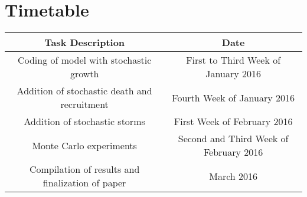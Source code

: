 \documentclass[12pt,letterpaper]{article}
\begin{document}


\section{Timetable}

\begin{tabular}{|c|c|}
\hline
Task Description & Date \\
\hline
Coding of model with stochastic growth & First to Third Week of January 2016\\
\hline
Addition of stochastic death and recruitment & Fourth Week of January 2016\\
\hline
Addition of stochastic storms & First Week of February 2016\\
\hline
Monte Carlo experiments & Second and Third Week of February 2016\\
\hline
Compilation of results and finalization of paper & March 2016\\
\hline
\end{tabular}



\label{sect:bib}

\end{document}
